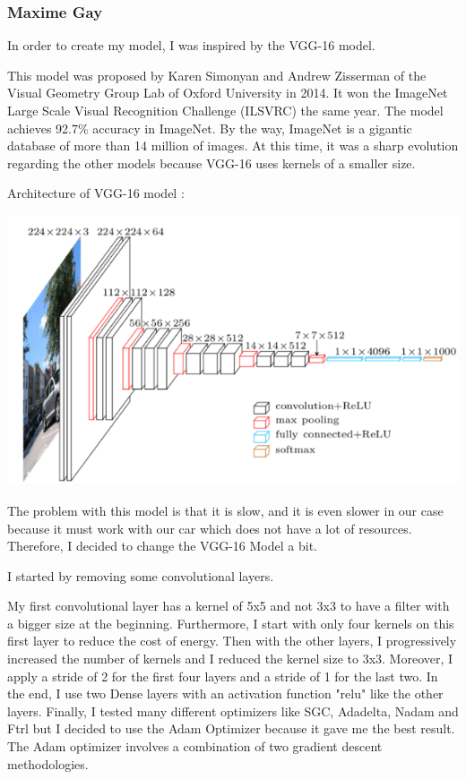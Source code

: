 \documentclass[12pt]{article}
\begin{document}
\subsubsection{Maxime Gay}
In order to create my model, I was inspired by the VGG-16 model.

This model was proposed by Karen Simonyan and Andrew Zisserman of the Visual Geometry Group Lab of Oxford University in 2014. It won the ImageNet Large Scale Visual Recognition Challenge (ILSVRC) the same year. The model achieves 92.7\% accuracy in ImageNet. By the way, ImageNet is a gigantic database of more than 14 million of images. At this time, it was a sharp evolution regarding the other models because VGG-16 uses kernels of a smaller size.


Architecture of VGG-16 model :

\centerline{\includegraphics[height=8cm]{../../docs/VGG16.png}}

The problem with this model is that it is slow, and it is even slower in our case because it must work with our car which does not have a lot of resources. Therefore, I decided to change the VGG-16 Model a bit.  

I started by removing some convolutional layers. 

My first convolutional layer has a kernel of 5x5 and not 3x3 to have a filter with a bigger size at the beginning. Furthermore, I start with only four kernels on this first layer to reduce the cost of energy. Then with the other layers, I progressively increased the number of kernels and I reduced the kernel size to 3x3. Moreover, I apply a stride of 2 for the first four layers and a stride of 1 for the last two. In the end, I use two Dense layers with an activation function "relu" like the other layers. Finally, I tested many different optimizers like SGC, Adadelta, Nadam and Ftrl but I decided to use the Adam Optimizer because it gave me the best result. The Adam optimizer involves a combination of two gradient descent methodologies. 
\end{document}
